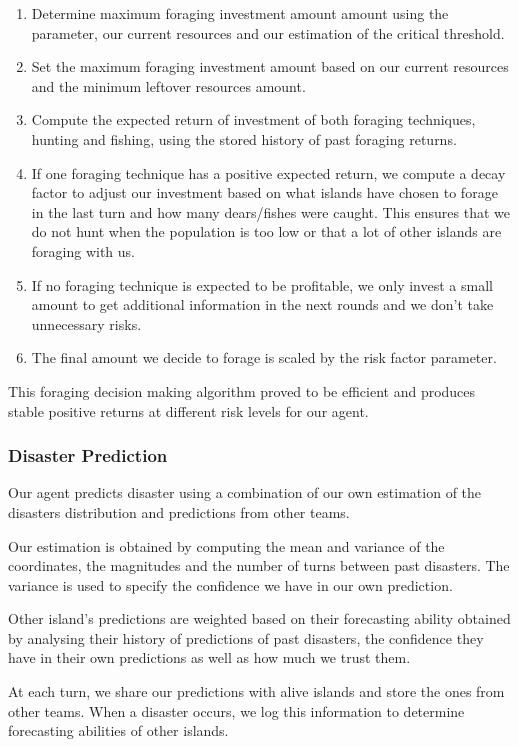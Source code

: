 \documentclass{article}
\begin{document}
\begin{enumerate}
    \item Determine maximum foraging investment amount amount using the  parameter, our current resources and our estimation of the critical threshold.
    \item Set the maximum foraging investment amount based on our current resources and the minimum leftover resources amount.
    \item Compute the expected return of investment of both foraging techniques, hunting and fishing, using the stored history of past foraging returns. 
    \item If one foraging technique has a positive expected return, we compute a decay factor to adjust our investment based on what islands have chosen to forage in the last turn and how many dears/fishes were caught. This ensures that we do not hunt when the population is too low or that a lot of other islands are foraging with us.
    \item If no foraging technique is expected to be profitable, we only invest a small amount to get additional information in the next rounds and we don't take unnecessary risks.  
    \item The final amount we decide to forage is scaled by the risk factor parameter.
\end{enumerate}

This foraging decision making algorithm proved to be efficient and produces stable positive returns at different risk levels for our agent.

\subsubsection{Disaster Prediction}

Our agent predicts disaster using a combination of our own estimation of the disasters distribution and predictions from other teams.

Our estimation is obtained by computing the mean and variance of the coordinates, the magnitudes and the number of turns between past disasters. The variance is used to specify the confidence we have in our own prediction.

Other island's predictions are weighted based on their forecasting ability obtained by analysing their history of predictions of past disasters, the confidence they have in their own predictions as well as how much we trust them.

At each turn, we share our predictions with alive islands and store the ones from other teams. When a disaster occurs, we log this information to determine forecasting abilities of other islands.
\end{document}
